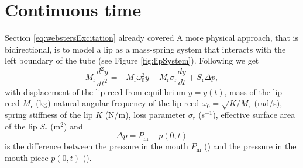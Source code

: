 \section{Continuous time}
Section \ref{eq:webstersExcitation} already covered  A more physical approach, that is bidirectional, is to model a lip as a mass-spring system that interacts with the left boundary of the tube (see Figure \ref{fig:lipSystem}). Following \cite{Harrison2018} we get
\begin{equation}
    M_\text{r}\frac{d^2y}{dt^2} = -M_\text{r} \omega_0^2 y - M_\text{r} \sigma_\text{r} \frac{dy}{dt} + S_\text{r}\Delta p,
\end{equation}
with displacement of the lip reed from equilibrium $y = y(t)$, mass of the lip reed $M_\text{r}$ (kg) natural angular frequency of the lip reed $\omega_0 = \sqrt{K/M_\text{r}}$ (rad/s), spring stiffness of the lip $K$ (N/m), loss parameter $\sigma_\text{r}$ (s$^{-1}$), effective surface area of the lip $S_\text{r}$ (m$^2$) and 
\begin{equation}
    \Delta p = P_\text{m} - p(0,t)
\end{equation}
is the difference between the pressure in the mouth $P_\text{m}$ (\SWcomment[kPa]) and the pressure in the mouth piece $p(0,t)$ (\SWcomment[kPa]). 
